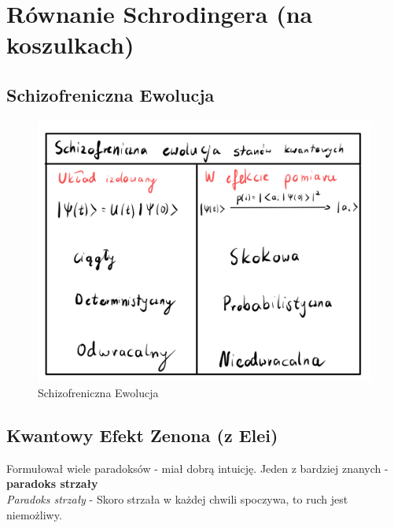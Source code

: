 \documentclass[12pt,a4paper]{report}
\newcommand{\psket}[1]{\ket{\Psi(#1)}}
\renewcommand{\emph}{\textbf}
\newenvironment{lecture}[1]{\par\medskip
   \noindent\chapter{#1} \rmfamily}{\medskip}
\begin{document}

\renewcommand{\psket}[1]{\ket{\Psi(#1)}}

\begin{lecture}{Równanie Schrodingera (na koszulkach)}
\section{Schizofreniczna Ewolucja}

\begin{figure}[!ht]
        \centering
        \includegraphics[width=\linewidth]{Wyk_4_Rys_1.jpeg}
        \caption{Schizofreniczna Ewolucja}
        \label{fig:lec_4:tabelka}
\end{figure}

\section{Kwantowy Efekt Zenona (z Elei)}
Formułował wiele paradoksów - miał dobrą intuicję. Jeden z bardziej znanych - \emph{paradoks strzały}\\
\textit{Paradoks strzały} - Skoro strzała w każdej chwili spoczywa, to ruch jest niemożliwy.


\end{lecture}
\end{document}
